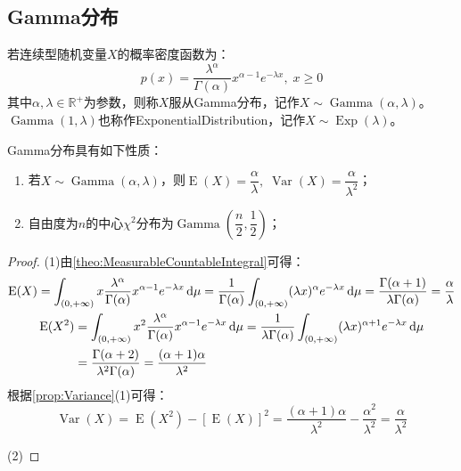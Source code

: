 \subsection{Gamma分布}
\begin{definition}
	若连续型随机变量$X$的概率密度函数为：
	\begin{equation*}
		p(x)=\frac{\lambda^\alpha}{\Gamma(\alpha)}x^{\alpha-1}e^{-\lambda x},\;x\geqslant0
	\end{equation*}
	其中$\alpha,\lambda\in\mathbb{R}^{+}$为参数，则称$X$服从Gamma分布，记作$X\sim\operatorname{Gamma}(\alpha,\lambda)$。$\operatorname{Gamma}(1,\lambda)$也称作\gls{ExponentialDistribution}，记作$X\sim\operatorname{Exp}(\lambda)$。
\end{definition}
\begin{property}
	Gamma分布具有如下性质：
	\begin{enumerate}
		\item 若$X\sim\operatorname{Gamma}(\alpha,\lambda)$，则$\operatorname{E}(X)=\dfrac{\alpha}{\lambda},\;\operatorname{Var}(X)=\dfrac{\alpha}{\lambda^2}$；
		\item 自由度为$n$的中心$\chi^2$分布为$\operatorname{Gamma}\left(\dfrac{n}{2},\dfrac{1}{2}\right)$；
	\end{enumerate}
\end{property}
\begin{proof}
	(1)由\cref{theo:MeasurableCountableIntegral}可得：
	\begin{gather*}
		\operatorname{E}(X)=\int_{(0,+\infty)}x\frac{\lambda^\alpha}{\Gamma(\alpha)}x^{\alpha-1}e^{-\lambda x}\mathop{}\!\mathrm{d}\mu=\frac{1}{\Gamma(\alpha)}\int_{(0,+\infty)}(\lambda x)^{\alpha}e^{-\lambda x}\mathop{}\!\mathrm{d}\mu=\frac{\Gamma(\alpha+1)}{\lambda\Gamma(\alpha)}=\frac{\alpha}{\lambda} \\
		\begin{aligned}
			\operatorname{E}(X^2)&=\int_{(0,+\infty)}x^2\frac{\lambda^\alpha}{\Gamma(\alpha)}x^{\alpha-1}e^{-\lambda x}\mathop{}\!\mathrm{d}\mu=\frac{1}{\lambda\Gamma(\alpha)}\int_{(0,+\infty)}(\lambda x)^{\alpha+1}e^{-\lambda x}\mathop{}\!\mathrm{d}\mu \\
			&=\frac{\Gamma(\alpha+2)}{\lambda^2\Gamma(\alpha)}=\frac{(\alpha+1)\alpha}{\lambda^2}
		\end{aligned}
	\end{gather*}
	根据\cref{prop:Variance}(1)可得：
	\begin{equation*}
		\operatorname{Var}(X)=\operatorname{E}(X^2)-[\operatorname{E}(X)]^2=\frac{(\alpha+1)\alpha}{\lambda^2}-\frac{\alpha^2}{\lambda^2}=\frac{\alpha}{\lambda^2}
	\end{equation*}\par
	(2)
\end{proof}

